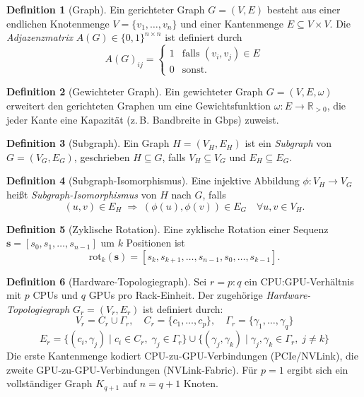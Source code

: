 ﻿\documentclass[a4paper,12pt]{article}
\theoremstyle{definition}
\newtheorem{definition}{Definition}
\begin{document}
\begin{definition}[Graph]
  Ein gerichteter Graph $G = (V, E)$ besteht aus einer endlichen Knotenmenge $V = \{v_1, \ldots, v_n\}$ und einer Kantenmenge $E \subseteq V \times V$.
  Die \emph{Adjazenzmatrix} $A(G) \in \{0,1\}^{n \times n}$ ist definiert durch
  \[
    A(G)_{ij} = \begin{cases} 1 & \text{falls } (v_i, v_j) \in E \\ 0 & \text{sonst.}\end{cases}
  \]
\end{definition}

\begin{definition}[Gewichteter Graph]
  Ein gewichteter Graph $G = (V, E, \omega)$ erweitert den gerichteten Graphen um eine Gewichtsfunktion $\omega: E \to \mathbb{R}_{>0}$, die jeder Kante eine Kapazit\"{a}t (z.\,B. Bandbreite in Gbps) zuweist.
\end{definition}

\begin{definition}[Subgraph]
  Ein Graph $H = (V_H, E_H)$ ist ein \emph{Subgraph} von $G = (V_G, E_G)$, geschrieben $H \subseteq G$, falls $V_H \subseteq V_G$ und $E_H \subseteq E_G$.
\end{definition}

\begin{definition}[Subgraph-Isomorphismus]
  Eine injektive Abbildung $\phi: V_H \to V_G$ hei{\ss}t \emph{Subgraph-Isomorphismus} von $H$ nach $G$, falls
  \[
    (u, v) \in E_H \;\Rightarrow\; (\phi(u), \phi(v)) \in E_G \quad \forall u, v \in V_H.
  \]
\end{definition}

\begin{definition}[Zyklische Rotation]
  Eine zyklische Rotation einer Sequenz $\mathbf{s} = [s_0, s_1, \ldots, s_{n-1}]$ um $k$ Positionen ist
  \[
    \mathrm{rot}_k(\mathbf{s}) = [s_k, s_{k+1}, \ldots, s_{n-1}, s_0, \ldots, s_{k-1}].
  \]
\end{definition}

\begin{definition}[Hardware-Topologiegraph]
  \label{def:htg}
  Sei $r = p:q$ ein CPU:GPU-Verh\"{a}ltnis mit $p$ CPUs und $q$ GPUs pro Rack-Einheit. Der zugeh\"{o}rige \emph{Hardware-Topologiegraph} $G_r = (V_r, E_r)$ ist definiert durch:
  \[
    V_r = C_r \cup \Gamma_r, \quad
    C_r = \{c_1, \ldots, c_p\}, \quad
    \Gamma_r = \{\gamma_1, \ldots, \gamma_q\}
  \]
  \[
    E_r = \{(c_i, \gamma_j) \mid c_i \in C_r,\; \gamma_j \in \Gamma_r\}
    \cup \{(\gamma_j, \gamma_k) \mid \gamma_j, \gamma_k \in \Gamma_r,\; j \neq k\}
  \]
  Die erste Kantenmenge kodiert CPU-zu-GPU-Verbindungen (PCIe/NVLink),
  die zweite GPU-zu-GPU-Verbindungen (NVLink-Fabric).
  F\"{u}r $p = 1$ ergibt sich ein vollst\"{a}ndiger Graph $K_{q+1}$ auf $n = q + 1$ Knoten.
\end{definition}
\end{document}
